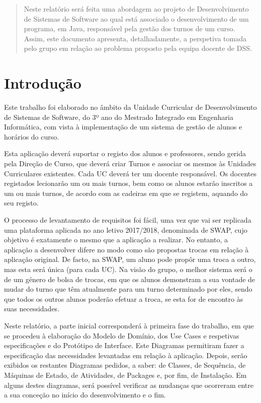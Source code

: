 \documentclass[a4paper]{article}
\begin{document}
\begin{abstract}

\hspace{3mm}Neste relatório será feita uma abordagem ao projeto de Desenvolvimento de Sistemas de Software ao qual está associado o desenvolvimento de um programa, em Java, responsável pela gestão dos turnos de um curso. Assim, este documento apresenta, detalhadamente, a perspetiva tomada pelo grupo em relação ao problema proposto pela equipa docente de DSS.

\end{abstract}

\pagebreak
\tableofcontents

\pagebreak
\section{Introdução}
\label{sec:1}

\hspace{3mm}Este trabalho foi elaborado no âmbito da Unidade Curricular de Desenvolvimento de Sistemas de Software, do 3º ano do Mestrado Integrado em Engenharia Informática, com vista à implementação de um sistema de gestão de alunos e horários do curso.

Esta aplicação deverá suportar o registo dos alunos e professores, sendo gerida pela Direção de Curso, que deverá criar Turnos e associar os mesmos às Unidades Curriculares existentes. Cada UC deverá ter um docente responsável. Os docentes registados lecionarão um ou mais turnos, bem como os alunos estarão inscritos a um ou mais turnos, de acordo com as cadeiras em que se registem, aquando do seu registo.

O processo de levantamento de requisitos foi fácil, uma vez que vai ser replicada uma plataforma aplicada no ano letivo 2017/2018, denominada de SWAP, cujo objetivo é exatamente o mesmo que a aplicação a realizar. No entanto, a aplicação a desenvolver difere no modo como são propostas trocas em relação à aplicação original. De facto, na SWAP, um aluno pode propôr uma troca a outro, mas esta será única (para cada UC). Na visão do grupo, o melhor sistema será o de um género de bolsa de trocas, em que os alunos demonstram a sua vontade de mudar do turno que têm atualmente para um turno determinado por eles, sendo que todos os outros alunos poderão efetuar a troca, se esta for de encontro às suas necessidades.

Neste relatório, a parte inicial corresponderá à primeira fase do trabalho, em que se procedeu à elaboração do Modelo de Domínio, dos Use Cases e respetivas especificações e do Protótipo de Interface. Este Diagramas permitiram fazer a especificação das necessidades levantadas em relação à aplicação.
Depois, serão exibidos os restantes Diagramas pedidos, a saber: de Classes, de Sequência, de Máquinas de Estado, de Atividades, de Packages e, por fim, de Instalação. Em alguns destes diagramas, será possível verificar as mudanças que ocorreram entre a sua conceção no início do desenvolvimento e o fim.
\end{document}
